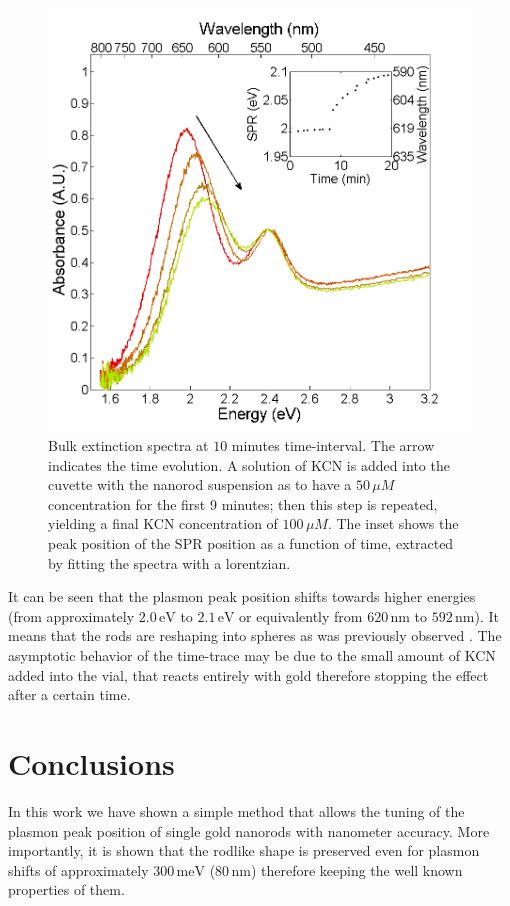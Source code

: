 \documentclass[twocolumn]{article}
\begin{document}
\begin{figure}[tp]
 \centering 
 \includegraphics[width=0.95\linewidth]{plasmon_bulk.png}
 \caption{Bulk extinction spectra at $10$ minutes time-interval. The arrow
 indicates the time evolution. A solution of KCN is added into the cuvette with
 the nanorod suspension as to have a $50\,\mu M$ concentration for the first 9
 minutes; then this step is repeated, yielding a final KCN concentration of
 $100\, \mu M$. The inset shows the peak position of the SPR position as a
 function of time, extracted by fitting the spectra with a lorentzian.  }
 \label{fig:bulk}
\end{figure}

It can be seen that the plasmon peak position shifts towards higher energies
(from approximately $2.0\,\textrm{eV}$ to $2.1\,\textrm{eV}$ or equivalently
from $620\,\textrm{nm}$ to $592\,\textrm{nm}$). It means that the rods are
reshaping into spheres as was previously observed \cite{Jana2002}. The
asymptotic behavior of the time-trace may be due to the small amount of KCN
added into the vial, that reacts entirely with gold therefore stopping the
effect after a certain time.

\section{Conclusions}
In this work we have shown a simple method that allows the tuning of the plasmon
peak position of single gold nanorods with nanometer accuracy. More
importantly, it is shown that the rodlike shape is preserved even for plasmon
shifts of approximately $300\,\textrm{meV}$ ($80\,\textrm{nm}$) therefore
keeping the well known properties of them.
\end{document}
